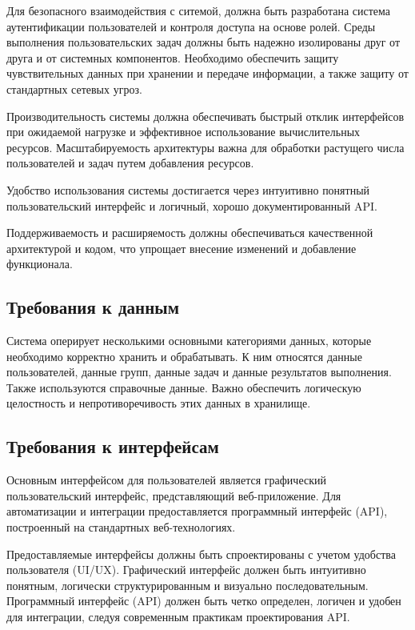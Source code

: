 Для безопасного взаимодействия с ситемой, должна быть разработана система аутентификации пользователей и контроля доступа на основе ролей. Среды выполнения пользовательских задач должны быть надежно изолированы друг от друга и от системных компонентов. Необходимо обеспечить защиту чувствительных данных при хранении и передаче информации, а также защиту от стандартных сетевых угроз.

Производительность системы должна обеспечивать быстрый отклик интерфейсов при ожидаемой нагрузке и эффективное использование вычислительных ресурсов. Масштабируемость архитектуры важна для обработки растущего числа пользователей и задач путем добавления ресурсов.

Удобство использования системы достигается через интуитивно понятный пользовательский интерфейс и логичный, хорошо документированный API.

Поддерживаемость и расширяемость должны обеспечиваться качественной архитектурой и кодом, что упрощает внесение изменений и добавление функционала.

\subsection{Требования к данным}

Система оперирует несколькими основными категориями данных, которые необходимо корректно хранить и обрабатывать.
К ним относятся данные пользователей, данные групп, данные задач и данные результатов выполнения.
Также используются справочные данные.
Важно обеспечить логическую целостность и непротиворечивость этих данных в хранилище.

\subsection{Требования к интерфейсам}

Основным интерфейсом для пользователей является графический пользовательский интерфейс, представляющий веб-приложение.
Для автоматизации и интеграции предоставляется программный интерфейс (API), построенный на стандартных веб-технологиях.

Предоставляемые интерфейсы должны быть спроектированы с учетом удобства пользователя (UI/UX).
Графический интерфейс должен быть интуитивно понятным, логически структурированным и визуально последовательным. Программный интерфейс (API) должен быть четко определен, логичен и удобен для интеграции, следуя современным практикам проектирования API.

